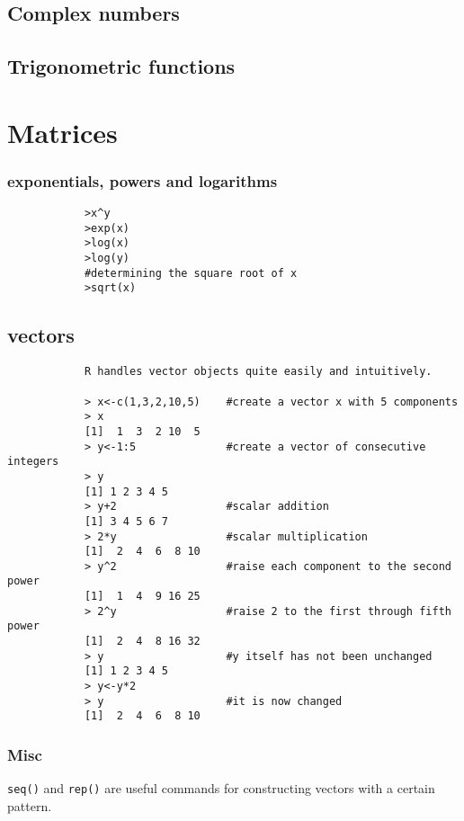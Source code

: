 \documentclass[a4paper,12pt]{article}
\begin{document}
\begin{itemize}
		\subsection{Complex numbers}
		\subsection{Trigonometric functions}
		\section{Matrices}
		
		
		
		\subsubsection{exponentials, powers and logarithms}
		\begin{framed}
			\begin{verbatim}
			>x^y
			>exp(x)
			>log(x)
			>log(y)
			#determining the square root of x
			>sqrt(x)
			\end{verbatim}
		\end{framed}
		
		\subsection{vectors}
		\begin{framed}
			\begin{verbatim}
			R handles vector objects quite easily and intuitively.
			
			> x<-c(1,3,2,10,5)    #create a vector x with 5 components
			> x
			[1]  1  3  2 10  5
			> y<-1:5              #create a vector of consecutive integers
			> y
			[1] 1 2 3 4 5
			> y+2                 #scalar addition
			[1] 3 4 5 6 7
			> 2*y                 #scalar multiplication
			[1]  2  4  6  8 10
			> y^2                 #raise each component to the second power
			[1]  1  4  9 16 25
			> 2^y                 #raise 2 to the first through fifth power
			[1]  2  4  8 16 32
			> y                   #y itself has not been unchanged
			[1] 1 2 3 4 5
			> y<-y*2
			> y                   #it is now changed
			[1]  2  4  6  8 10
			\end{verbatim}
		\end{framed}
		
		\subsubsection{Misc}
		\texttt{seq()} and \texttt{rep()} are useful commands for constructing vectors with a certain pattern.
		

\end{itemize}
\end{document}
